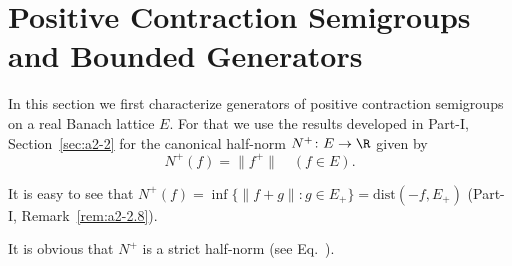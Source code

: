 \section{Positive Contraction Semigroups and Bounded Generators}\label{sec:c2-1}%
In this section we first characterize generators of positive contraction semigroups on a real Banach lattice $E$.
For that we use the results developed in Part-I, Section~\ref{sec:a2-2} for the canonical half-norm $N^{+} \colon E \to \R$ given by
\begin{equation}\label{eq:c2-1.1}
N^{+}(f) = \|f^{+}\| \quad (f \in E).
\end{equation}
\begin{remark*}\label{rem:c2-1.1}
%
It is easy to see that $N^{+}(f) = \inf \{\|f+g\| \colon g \in E_{+}\} = \text{dist}(-f,E_{+})$ (\cf Part-I, Remark~\ref{rem:a2-2.8}). 
\end{remark*}
It is obvious that $N^{+}$ is a strict half-norm (see Eq.~). 

